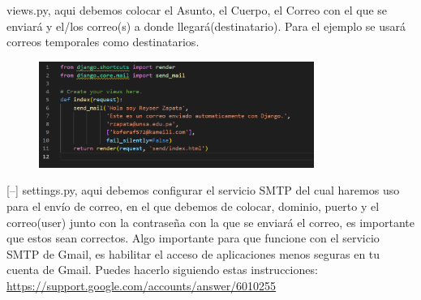 \documentclass{article}
\begin{document}
\begin{enumerate}
		\begin{description}
			[--] views.py, aqui debemos colocar el Asunto, el Cuerpo, el Correo con el que se enviará y el/los correo(s) a donde llegará(destinatario). Para el ejemplo se usará correos temporales como destinatarios.
			\begin{figure}[H]
				\centering
				\includegraphics[width=0.8\textwidth,keepaspectratio]{img/Ejercicio4/view.png}
			\end{figure}
			[--] settings.py, aqui debemos configurar el servicio SMTP del cual haremos uso para el envío de correo, en el que debemos de colocar, dominio, puerto y el correo(user) junto con la contraseña con la que se enviará el correo, es importante que estos sean correctos. Algo importante para que funcione con el servicio SMTP de Gmail, es habilitar el acceso de aplicaciones menos seguras en tu cuenta de Gmail. Puedes hacerlo siguiendo estas instrucciones: \url{https://support.google.com/accounts/answer/6010255}
			

\end{description}
\end{enumerate}
\end{document}
